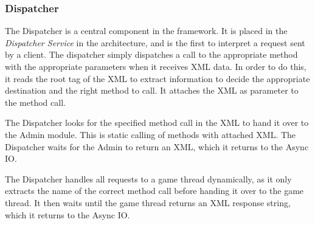 \subsubsection{Dispatcher}\label{subsec:dispatcherdesign}
The Dispatcher is a central component in the framework. It is placed in the \textit{Dispatcher Service} in the architecture, and is the first to interpret a request sent by a client. The dispatcher simply dispatches a call to the appropriate method with the appropriate parameters when it receives XML data. In order to do this, it reads the root tag of the XML to extract information to decide the appropriate destination and the right method to call. It attaches the XML as parameter to the method call.

The Dispatcher looks for the specified method call in the XML to hand it over to the Admin module. This is static calling of methods with attached XML. The Dispatcher waits for the Admin to return an XML, which it returns to the Async IO.

The Dispatcher handles all requests to a game thread dynamically, as it only extracts the name of the correct method call before handing it over to the game thread. It then waits until the game thread returns an XML response string, which it returns to the Async IO.